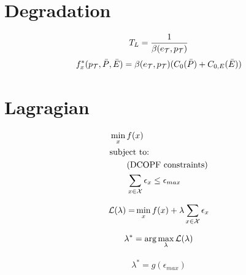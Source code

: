 \documentclass{homework}
\begin{document}
\section{Degradation}
\begin{equation*}
    T_L = \frac{1}{\beta(e_{\mathcal{T}}, p_{\mathcal{T}})}
\end{equation*}
\begin{align*}
    f^*_x(p_{\mathcal{T}}, \bar{P}, \bar{E}) = \beta(e_{\mathcal{T}}, p_{\mathcal{T}})(C_0(\bar{P}) + C_{0,E}(\bar{E}))
\end{align*}

\section{Lagragian}
\begin{align*}
    &\min_x f(x) \\
    &\text{subject to:} \\
    &\qquad \text{(DCOPF constraints)} \\
    &\qquad \sum_{x\in\mathcal{X}} \epsilon_x \leq \epsilon_{max}
\end{align*}

\begin{align*}
    \mathcal{L}(\lambda) = &\min_x f(x) + \lambda \sum_{x\in\mathcal{X}} \epsilon_x \\
\end{align*}


\begin{align*}
    \lambda^* = \text{arg}\max_\lambda \mathcal{L}(\lambda)
\end{align*}

\begin{align*}
    \lambda^* = g(\epsilon_{max})
\end{align*}
\end{document}
